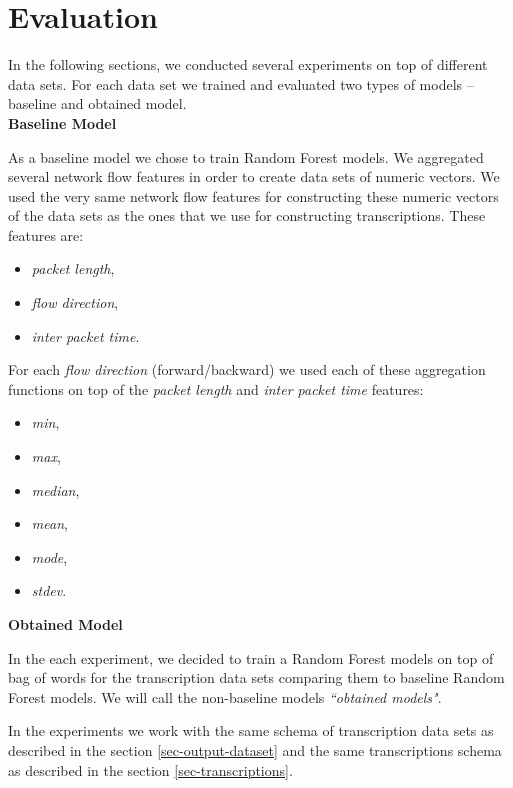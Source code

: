 \documentclass{article}
\begin{document}
\clearpage
\section{Evaluation}

In the following sections, we conducted several experiments on top of different data sets. For each data set we trained and evaluated two types of models -- baseline and obtained model.\\

\noindent\textbf{Baseline Model}

As a baseline model we chose to train Random Forest models. We aggregated several network flow features in order to create data sets of numeric vectors. We used the very same network flow features for constructing these numeric vectors of the data sets as the ones that we use for constructing transcriptions. These features are:

\begin{itemize}
    \item \textit{packet length},
    \item \textit{flow direction},
    \item \textit{inter packet time}.
\end{itemize}

\noindent For each \textit{flow direction} (forward/backward) we used each of these aggregation functions on top of the \textit{packet length} and \textit{inter packet time} features:

\begin{itemize}
    \item \textit{min},
    \item \textit{max},
    \item \textit{median},
    \item \textit{mean},
    \item \textit{mode},
    \item \textit{stdev}.
\end{itemize}

\vspace{0.4cm}


\noindent\textbf{Obtained Model}

In the each experiment, we decided to train a Random Forest models on top of bag of words for the transcription data sets comparing them to baseline Random Forest models. We will call the non-baseline models \textit{``obtained models"}.

In the experiments we work with the same schema of transcription data sets as described in the section \ref{sec-output-dataset} and the same transcriptions schema as described in the section \ref{sec-transcriptions}.
\end{document}
